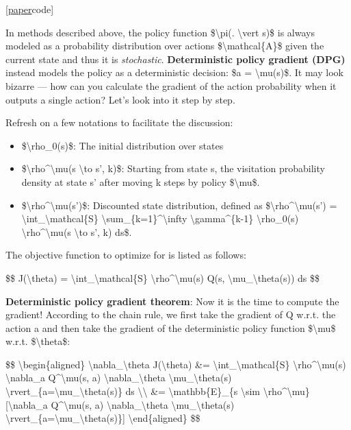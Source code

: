 {[}\href{https://hal.inria.fr/file/index/docid/938992/filename/dpg-icml2014.pdf}{paper}\textbar code{]}

In methods described above, the policy function \$\textbackslash pi(. \textbackslash vert s)\$ is always modeled as a probability distribution over actions \$\textbackslash mathcal\{A\}\$ given the current state and thus it is \emph{stochastic}. \textbf{Deterministic policy gradient (DPG)} instead models the policy as a deterministic decision: \$a = \textbackslash mu(s)\$. It may look bizarre --- how can you calculate the gradient of the action probability when it outputs a single action? Let's look into it step by step.

Refresh on a few notations to facilitate the discussion:

\begin{itemize}
\tightlist
\item
  \$\textbackslash rho\_0(s)\$: The initial distribution over states
\item
  \$\textbackslash rho\^{}\textbackslash mu(s \textbackslash to s', k)\$: Starting from state s, the visitation probability density at state s' after moving k steps by policy \$\textbackslash mu\$.
\item
  \$\textbackslash rho\^{}\textbackslash mu(s')\$: Discounted state distribution, defined as \$\textbackslash rho\^{}\textbackslash mu(s') = \textbackslash int\_\textbackslash mathcal\{S\} \textbackslash sum\_\{k=1\}\^{}\textbackslash infty \textbackslash gamma\^{}\{k-1\} \textbackslash rho\_0(s) \textbackslash rho\^{}\textbackslash mu(s \textbackslash to s', k) ds\$.
\end{itemize}

The objective function to optimize for is listed as follows:

\$\$ J(\textbackslash theta) = \textbackslash int\_\textbackslash mathcal\{S\} \textbackslash rho\^{}\textbackslash mu(s) Q(s, \textbackslash mu\_\textbackslash theta(s)) ds \$\$

\textbf{Deterministic policy gradient theorem}: Now it is the time to compute the gradient! According to the chain rule, we first take the gradient of Q w.r.t. the action a and then take the gradient of the deterministic policy function \$\textbackslash mu\$ w.r.t. \$\textbackslash theta\$:

\$\$ \textbackslash begin\{aligned\} \textbackslash nabla\_\textbackslash theta J(\textbackslash theta) \&= \textbackslash int\_\textbackslash mathcal\{S\} \textbackslash rho\^{}\textbackslash mu(s) \textbackslash nabla\_a Q\^{}\textbackslash mu(s, a) \textbackslash nabla\_\textbackslash theta \textbackslash mu\_\textbackslash theta(s) \textbackslash rvert\_\{a=\textbackslash mu\_\textbackslash theta(s)\} ds \textbackslash\textbackslash{} \&= \textbackslash mathbb\{E\}\_\{s \textbackslash sim \textbackslash rho\^{}\textbackslash mu\} {[}\textbackslash nabla\_a Q\^{}\textbackslash mu(s, a) \textbackslash nabla\_\textbackslash theta \textbackslash mu\_\textbackslash theta(s) \textbackslash rvert\_\{a=\textbackslash mu\_\textbackslash theta(s)\}{]} \textbackslash end\{aligned\} \$\$

